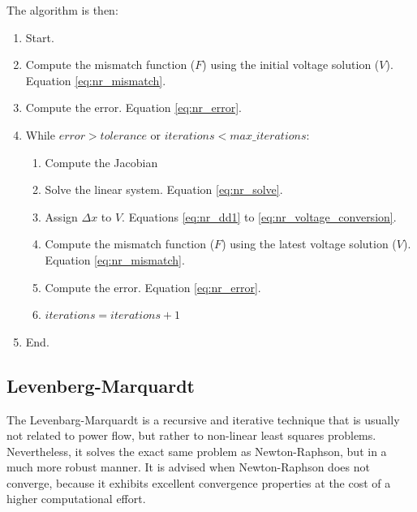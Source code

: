 \documentclass[a4paper,twoside]{tufte-book}
\begin{document}
The algorithm is then:

\begin{enumerate}

\item Start.

\item Compute the mismatch function ($F$) using the initial voltage solution ($V$). Equation \ref{eq:nr_mismatch}.

\item Compute the error. Equation \ref{eq:nr_error}.

\item While $error > tolerance$ or $iterations < max\_iterations$:

	\begin{enumerate}
	\item Compute the Jacobian
	
	\item Solve the linear system. Equation \ref{eq:nr_solve}.
	
	\item Assign $\Delta x$ to $V$. Equations \ref{eq:nr_dd1} to \ref{eq:nr_voltage_conversion}.
	
	\item Compute the mismatch function ($F$) using the latest voltage solution ($V$). Equation \ref{eq:nr_mismatch}.
	
	\item Compute the error. Equation \ref{eq:nr_error}.
	
	\item $iterations = iterations + 1$
	\end{enumerate}

\item End.
\end{enumerate}



\newpage
\subsection{Levenberg-Marquardt}

The Levenbarg-Marquardt is a recursive and iterative technique that is usually not related to power flow, but rather to non-linear least squares problems. Nevertheless, it solves the exact same problem as Newton-Raphson, but in a much more robust manner. It is advised when Newton-Raphson does not converge, because it exhibits excellent convergence properties at the cost of a higher computational effort.
\end{document}
